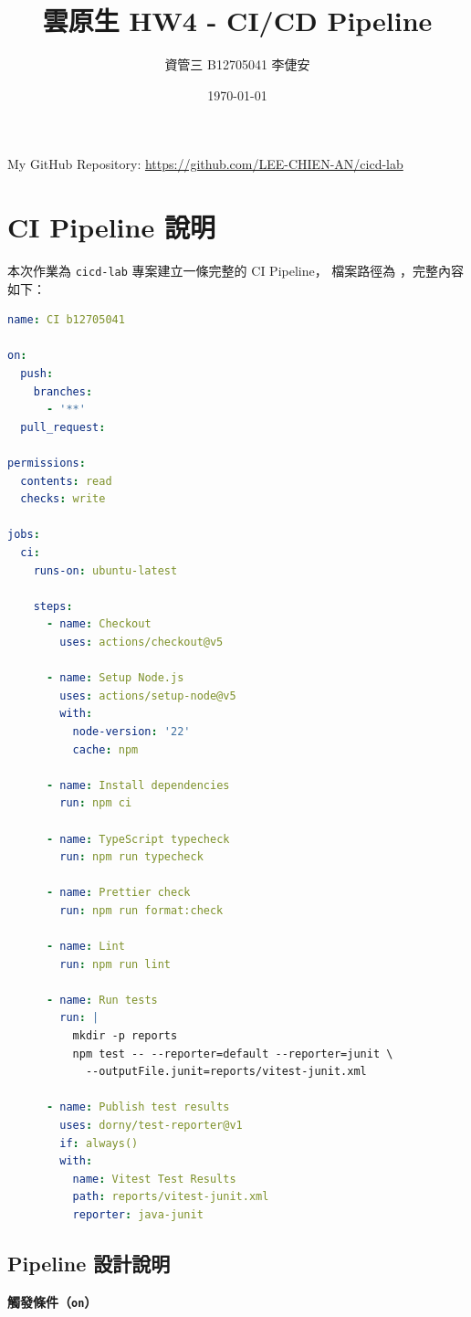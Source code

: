 \documentclass[11pt,a4paper]{article}
\begin{document}
\title{雲原生 HW4 - CI/CD Pipeline}
\author{資管三 B12705041 李倢安}
\date{\today}
\maketitle
My GitHub Repository: \url{https://github.com/LEE-CHIEN-AN/cicd-lab}

\section*{CI Pipeline 說明}

本次作業為 \texttt{cicd-lab} 專案建立一條完整的 CI Pipeline，
檔案路徑為 ，完整內容如下：
\begin{lstlisting}[language=YAML]
name: CI b12705041

on:
  push:
    branches:
      - '**'
  pull_request:

permissions:
  contents: read
  checks: write

jobs:
  ci:
    runs-on: ubuntu-latest

    steps:
      - name: Checkout
        uses: actions/checkout@v5

      - name: Setup Node.js
        uses: actions/setup-node@v5
        with:
          node-version: '22'
          cache: npm

      - name: Install dependencies
        run: npm ci

      - name: TypeScript typecheck
        run: npm run typecheck

      - name: Prettier check
        run: npm run format:check

      - name: Lint
        run: npm run lint

      - name: Run tests
        run: |
          mkdir -p reports
          npm test -- --reporter=default --reporter=junit \
            --outputFile.junit=reports/vitest-junit.xml

      - name: Publish test results
        uses: dorny/test-reporter@v1
        if: always()
        with:
          name: Vitest Test Results
          path: reports/vitest-junit.xml
          reporter: java-junit
\end{lstlisting}

\subsection*{Pipeline 設計說明}

\textbf{觸發條件（\texttt{on}）}
\end{document}
